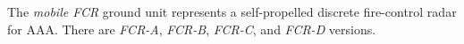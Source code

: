 
The \emph{mobile FCR} ground unit represents a self-propelled discrete fire-control radar for AAA. There are \emph{FCR-A}, \emph{FCR-B}, \emph{FCR-C}, and \emph{FCR-D} versions.
